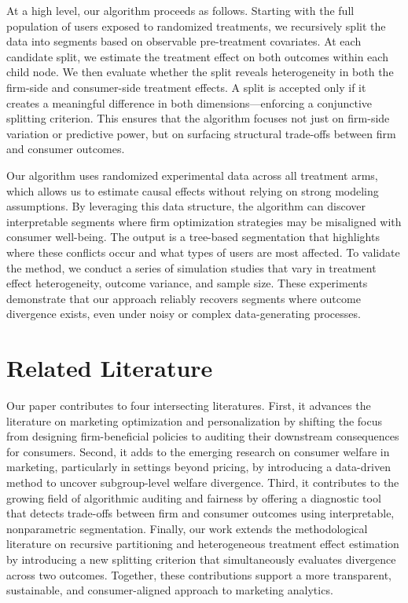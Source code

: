 \documentclass[11pt,letterpaper,english]{article}
\theoremstyle{definition}
\theoremstyle{definition}
\begin{document}
\begin{bibunit}
At a high level, our algorithm proceeds as follows. Starting with the full population of users exposed to randomized treatments, we recursively split the data into segments based on observable pre-treatment covariates. At each candidate split, we estimate the treatment effect on both outcomes within each child node. We then evaluate whether the split reveals heterogeneity in both the firm-side and consumer-side treatment effects. A split is accepted only if it creates a meaningful difference in both dimensions—enforcing a conjunctive splitting criterion. This ensures that the algorithm focuses not just on firm-side variation or predictive power, but on surfacing structural trade-offs between firm and consumer outcomes.

Our algorithm uses randomized experimental data across all treatment arms, which allows us to estimate causal effects without relying on strong modeling assumptions. By leveraging this data structure, the algorithm can discover interpretable segments where firm optimization strategies may be misaligned with consumer well-being. The output is a tree-based segmentation that highlights where these conflicts occur and what types of users are most affected. To validate the method, we conduct a series of simulation studies that vary in treatment effect heterogeneity, outcome variance, and sample size. These experiments demonstrate that our approach reliably recovers segments where outcome divergence exists, even under noisy or complex data-generating processes.

\section{Related Literature}
\label{sec:related_lit}
Our paper contributes to four intersecting literatures. First, it advances the literature on marketing optimization and personalization by shifting the focus from designing firm-beneficial policies to auditing their downstream consequences for consumers. Second, it adds to the emerging research on consumer welfare in marketing, particularly in settings beyond pricing, by introducing a data-driven method to uncover subgroup-level welfare divergence. Third, it contributes to the growing field of algorithmic auditing and fairness by offering a diagnostic tool that detects trade-offs between firm and consumer outcomes using interpretable, nonparametric segmentation. Finally, our work extends the methodological literature on recursive partitioning and heterogeneous treatment effect estimation by introducing a new splitting criterion that simultaneously evaluates divergence across two outcomes. Together, these contributions support a more transparent, sustainable, and consumer-aligned approach to marketing analytics.


\end{bibunit}
\end{document}
